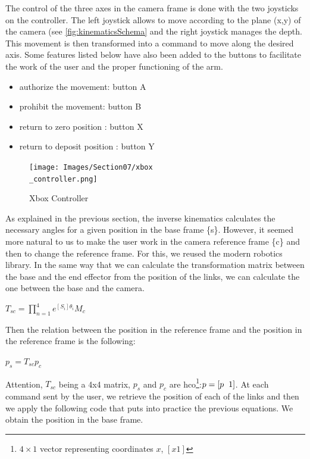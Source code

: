 \bigbreak
The control of the three axes in the camera frame is done with the two joysticks on the controller. The left joystick allows to move according to the plane (x,y) of the camera (see \ref{fig:kinematicsSchema} and the right joystick manages the depth. This movement is then transformed into a command to move along the desired axis. Some features listed below have also been added to the buttons to facilitate the work of the user and the proper functioning of the arm.
\begin{itemize}[noitemsep]
    \item authorize the movement: button A
    \item prohibit the movement: button B
    \item return to zero position : button X
    \item return to deposit position : button Y
\end{itemize}

\begin{figure}[ht]
    \centering
    \texttt{[image: Images/Section07/xbox\\\_controller.png]}
    \caption{Xbox Controller}
    \label{fig:XboxController}
\end{figure}
\FloatBarrier

\bigbreak
As explained in the previous section, the inverse kinematics calculates the necessary angles for a given position in the base frame \{s\}. However, it seemed more natural to us to make the user work in the camera reference frame \{c\} and then to change the reference frame. For this, we reused the modern robotics library. In the same way that we can calculate the transformation matrix between the base and the end effector from the position of the links, we can calculate the one between the base and the camera. 
\begin{center}
    $T_{sc} =\displaystyle \prod_{n=1}^4e^{[S_i]\theta_i}M_c$
\end{center}

\bigbreak
Then the relation between the position in the reference frame and the position in the reference frame is the following:
\begin{center}
    $p_s = T_{sc}p_c$
\end{center}

\bigbreak
Attention, $T_{sc}$ being a 4x4 matrix, $p_s$ and $p_c$ are \gls{hco}\footnote{$4\times1$ vector representing coordinates $x$, $[x 1]$}:$p = [p\hspace{0.2cm}1]$. At each command sent by the user, we retrieve the position of each of the links and then we apply the following code that puts into practice the previous equations. We obtain the position in the base frame.


